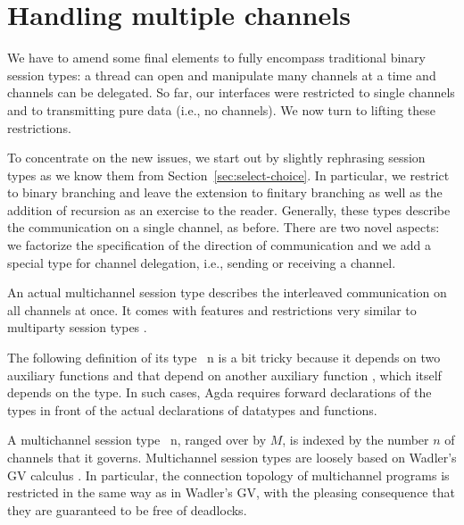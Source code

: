 \documentclass[acmsmall,review,anonymous,screen]{acmart}
\begin{document}
\section{Handling multiple channels}
\label{sec:handl-mult-chann}


We have to amend some final elements to fully encompass traditional binary
session types: a thread can open and manipulate many channels at a
time and channels can be delegated. So far, our interfaces were
restricted to single channels and to transmitting pure data (i.e., no channels). We
now turn to lifting these restrictions.

To concentrate on the new issues, 
we start out by slightly rephrasing session types as we
know them from Section~\ref{sec:select-choice}. In particular, we
restrict to binary branching and leave the extension
to finitary branching as well as the addition of recursion as an
exercise to the reader. Generally, these types describe 
the communication on a single channel, as before. There are two novel
aspects: we factorize the specification of the direction of
communication and we add a special type for channel delegation, i.e.,
sending or receiving a channel.

\multiSession

An actual multichannel session type describes the interleaved
communication on all channels at once. It comes with features and
restrictions very similar to multiparty session types
\cite{DBLP:journals/jacm/HondaYC16}.

The following definition of its type  {\AMSession~n} is a bit tricky
because it depends on two auxiliary functions {\ACausality} and
{\ACheckDual} that depend on another auxiliary function {\Aproject},
which itself depends on the {\AMSession} type. In such cases, Agda
requires forward declarations of the types in front of the actual
declarations of datatypes and functions. 

\multiMSesson

A multichannel session type {\AMSession~n}, ranged over by $M$, is indexed by the number $n$ of
channels that it governs. Multichannel session types are loosely based on Wadler's GV
calculus \cite{DBLP:journals/jfp/Wadler14}. In particular, the
connection topology of multichannel programs is restricted in the same
way as in Wadler's GV, with the pleasing
consequence that they are guaranteed to be free of deadlocks.
\end{document}
